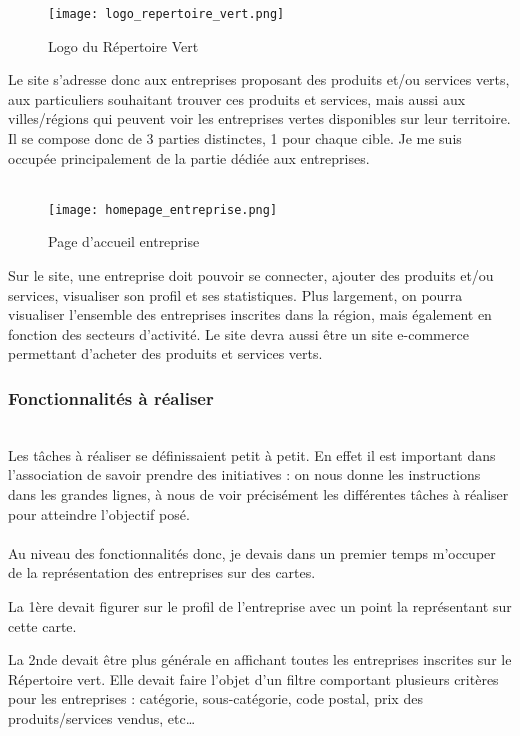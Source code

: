\begin{figure}[H]
    \centering
    \texttt{[image: logo\_repertoire\_vert.png]}
    \caption{Logo du Répertoire Vert}
\end{figure}

Le site s'adresse donc aux entreprises proposant des produits et/ou services verts, aux particuliers souhaitant trouver ces produits et services, 
mais aussi aux villes/régions qui peuvent voir les entreprises vertes disponibles sur leur territoire. Il se compose donc de 3 parties distinctes, 1 pour chaque cible.
Je me suis occupée principalement de la partie dédiée aux entreprises.
\\\\
\begin{figure}[H]
    \centering
    \texttt{[image: homepage\_entreprise.png]}
    \caption{Page d'accueil entreprise}
\end{figure}


Sur le site, une entreprise doit pouvoir se connecter, ajouter des produits et/ou services, visualiser son profil et ses statistiques.
Plus largement, on pourra visualiser l'ensemble des entreprises inscrites dans la région, mais également en fonction des secteurs d'activité. Le site devra aussi être un site e-commerce permettant d'acheter des produits et services verts.

\subsubsection{Fonctionnalités à réaliser}
\label{fonctionnalites}
~\\
Les tâches à réaliser se définissaient petit à petit. En effet il est important dans l'association de savoir prendre des initiatives : 
on nous donne les instructions dans les grandes lignes, à nous de voir précisément les différentes tâches à réaliser pour atteindre l'objectif posé.
\\\\
Au niveau des fonctionnalités donc, je devais dans un premier temps m'occuper de la représentation des entreprises sur des cartes. 

La 1ère devait figurer sur le profil de l'entreprise avec un point la représentant sur cette carte.

La 2nde devait être plus générale en affichant toutes les entreprises inscrites sur le Répertoire vert. 
Elle devait faire l'objet d'un filtre comportant plusieurs critères pour les entreprises : catégorie, sous-catégorie, code postal, prix des produits/services vendus, etc\dots

